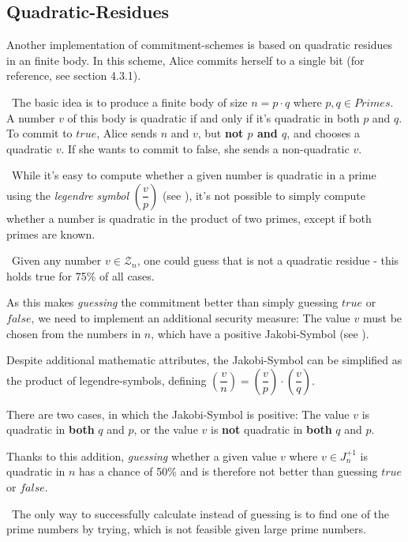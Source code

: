 \subsection{Quadratic-Residues}
Another implementation of commitment-schemes is based on quadratic residues in an finite body. In this scheme, Alice commits herself to a single bit (for reference, see \cite{DeHa15} section 4.3.1). 

~\newline The basic idea is to produce a finite body of size $n = p \cdot q $ where $p,q \in Primes$. A number $v$ of this body is quadratic if and only if it's quadratic in both $p$ and $q$. To commit to $true$, Alice sends $n$ and $v$, but\textbf{ not $p$ and $q$}, and chooses a quadratic $v$. If she wants to commit to false, she sends a non-quadratic $v$. 

~\newline While it's easy to compute whether a given number is quadratic in a prime using the \textit{legendre symbol} $(\dfrac{v}{p})$ (see \cite{PrGloLeg}), it's not possible to simply compute whether a number is quadratic in the product of two primes, except if both primes are known. 

~\newline Given any number $v \in \mathcal{Z}_n$, one could guess that is not a quadratic residue - this holds true for 75\% of all cases. 

As this makes \textit{guessing} the commitment better than simply guessing $true$ or $false$, we need to implement an additional security measure: The value $v$ must be chosen from the numbers in $n$, which have a positive Jakobi-Symbol (see \cite{PrGloJak}). 

Despite additional mathematic attributes, the Jakobi-Symbol can be simplified as the product of legendre-symbols, defining $(\dfrac{v}{n})= (\dfrac{v}{p})\cdot (\dfrac{v}{q})$.

There are two cases, in which the Jakobi-Symbol is positive: The value $v$ is quadratic in \textbf{both} $q$ and $p$, or the value $v$ is \textbf{not} quadratic in \textbf{both} $q$ and $p$. 

Thanks to this addition, \textit{guessing} whether a given value $v$ where $v \in J_n^{+1}$ is quadratic in $n$ has a chance of 50\% and is therefore not better than guessing $true$ or $false$. 

~\newline The only way to successfully calculate instead of guessing is to find one of the prime numbers by trying, which is not feasible given large prime numbers.

